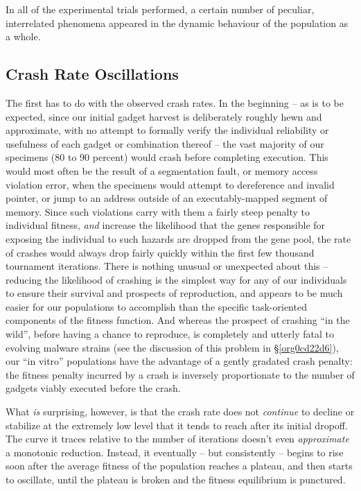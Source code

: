 \documentclass[12pt,glossary]{dalthesis}
\begin{document}
In all of the experimental trials performed, a certain number of peculiar,
interrelated phenomena appeared in the dynamic behaviour of the population
as a whole. 

\subsection{Crash Rate Oscillations}
\label{sec:orgf3eeb77}
The first has to do with the observed crash rates. In the beginning -- as is to
be expected, since our initial gadget harvest is deliberately roughly hewn
and approximate, with no attempt to formally verify the individual reliability
or usefulness of each gadget or combination thereof -- the vast majority of our
specimens (80 to 90 percent) would crash before completing execution. This would
most often be the result of a segmentation fault, or memory access violation error,
when the specimens would attempt to dereference and invalid pointer, or jump to an
address outside of an executably-mapped segment of memory. Since such violations
carry with them a fairly steep penalty to individual fitness, \emph{and} increase the
likelihood that the genes responsible for exposing the individual to such hazards
are dropped from the gene pool, the rate of crashes would always drop fairly quickly
within the first few thousand tournament iterations. There is nothing unusual or
unexpected about this -- reducing the likelihood of crashing is the simplest way
for any of our individuals to ensure their survival and prospects of reproduction,
and appears to be much easier for our populations to accomplish than the specific
task-oriented components of the fitness function. And whereas the prospect of
crashing ``in the wild'', before having a chance to reproduce, is completely and
utterly fatal to evolving malware strains (see the discussion of this problem
in \S \ref{org0cd22d6}), our ``in vitro'' populations have the advantage of a gently
gradated crash penalty: the fitness penalty incurred by a crash is inversely
proportionate to the number of gadgets viably executed before the crash.

What \emph{is} surprising, however, is that the crash rate does not \emph{continue}
to decline or stabilize at the extremely low level that it tends
to reach after its initial dropoff. The curve it traces relative to the
number of iterations doesn't even \emph{approximate} a monotonic reduction.
Instead, it eventually -- but consistently -- begins to rise soon after the
average fitness of the population reaches a plateau, and then starts to
oscillate, until the plateau is broken and the fitness equilibrium is
punctured. 
\end{document}
